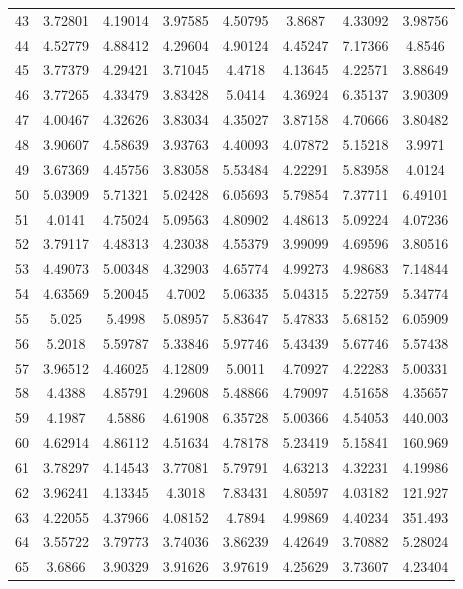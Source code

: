 \begin{center}
\begin{longtable}{cccccccc}
43 & 3.72801 & 4.19014 & 3.97585 & 4.50795 & 3.8687 & 4.33092 & 3.98756\\
44 & 4.52779 & 4.88412 & 4.29604 & 4.90124 & 4.45247 & 7.17366 & 4.8546\\
45 & 3.77379 & 4.29421 & 3.71045 & 4.4718 & 4.13645 & 4.22571 & 3.88649\\
46 & 3.77265 & 4.33479 & 3.83428 & 5.0414 & 4.36924 & 6.35137 & 3.90309\\
47 & 4.00467 & 4.32626 & 3.83034 & 4.35027 & 3.87158 & 4.70666 & 3.80482\\
48 & 3.90607 & 4.58639 & 3.93763 & 4.40093 & 4.07872 & 5.15218 & 3.9971\\
49 & 3.67369 & 4.45756 & 3.83058 & 5.53484 & 4.22291 & 5.83958 & 4.0124\\
50 & 5.03909 & 5.71321 & 5.02428 & 6.05693 & 5.79854 & 7.37711 & 6.49101\\
51 & 4.0141 & 4.75024 & 5.09563 & 4.80902 & 4.48613 & 5.09224 & 4.07236\\
52 & 3.79117 & 4.48313 & 4.23038 & 4.55379 & 3.99099 & 4.69596 & 3.80516\\
53 & 4.49073 & 5.00348 & 4.32903 & 4.65774 & 4.99273 & 4.98683 & 7.14844\\
54 & 4.63569 & 5.20045 & 4.7002 & 5.06335 & 5.04315 & 5.22759 & 5.34774\\
55 & 5.025 & 5.4998 & 5.08957 & 5.83647 & 5.47833 & 5.68152 & 6.05909\\
56 & 5.2018 & 5.59787 & 5.33846 & 5.97746 & 5.43439 & 5.67746 & 5.57438\\
57 & 3.96512 & 4.46025 & 4.12809 & 5.0011 & 4.70927 & 4.22283 & 5.00331\\
58 & 4.4388 & 4.85791 & 4.29608 & 5.48866 & 4.79097 & 4.51658 & 4.35657\\
59 & 4.1987 & 4.5886 & 4.61908 & 6.35728 & 5.00366 & 4.54053 & 440.003\\
60 & 4.62914 & 4.86112 & 4.51634 & 4.78178 & 5.23419 & 5.15841 & 160.969\\
61 & 3.78297 & 4.14543 & 3.77081 & 5.79791 & 4.63213 & 4.32231 & 4.19986\\
62 & 3.96241 & 4.13345 & 4.3018 & 7.83431 & 4.80597 & 4.03182 & 121.927\\
63 & 4.22055 & 4.37966 & 4.08152 & 4.7894 & 4.99869 & 4.40234 & 351.493\\
64 & 3.55722 & 3.79773 & 3.74036 & 3.86239 & 4.42649 & 3.70882 & 5.28024\\
65 & 3.6866 & 3.90329 & 3.91626 & 3.97619 & 4.25629 & 3.73607 & 4.23404\\

\end{longtable}
\end{center}
